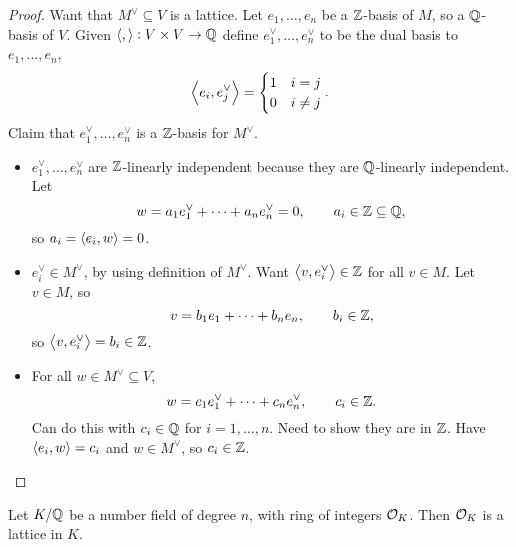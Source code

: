 \pagebreak

\begin{proof}
Want that $ M^\vee \subseteq V $ is a lattice. Let $ e_1, \dots, e_n $ be a $ \mathbb{Z} $-basis of $ M $, so a $ \mathbb{Q} $-basis of $ V $. Given $ \left\langle , \right\rangle : V \times V \to \mathbb{Q} $ define $ e_1^\vee, \dots, e_n^\vee $ to be the dual basis to $ e_1, \dots, e_n $,
$$ \left\langle e_i, e_j^\vee \right\rangle =
\begin{cases}
1 & i = j \\
0 & i \ne j
\end{cases}.
$$
Claim that $ e_1^\vee, \dots, e_n^\vee $ is a $ \mathbb{Z} $-basis for $ M^\vee $.
\begin{itemize}
\item $ e_1^\vee, \dots, e_n^\vee $ are $ \mathbb{Z} $-linearly independent because they are $ \mathbb{Q} $-linearly independent. Let
$$ w = a_1e_1^\vee + \dots + a_ne_n^\vee = 0, \qquad a_i \in \mathbb{Z} \subseteq \mathbb{Q}, $$
so $ a_i = \left\langle e_i, w \right\rangle = 0 $.
\item $ e_i^\vee \in M^\vee $, by using definition of $ M^\vee $. Want $ \left\langle v, e_i^\vee \right\rangle \in \mathbb{Z} $ for all $ v \in M $. Let $ v \in M $, so
$$ v = b_1e_1 + \dots + b_ne_n, \qquad b_i \in \mathbb{Z}, $$
so $ \left\langle v, e_i^\vee \right\rangle = b_i \in \mathbb{Z} $.
\item For all $ w \in M^\vee \subseteq V $,
$$ w = c_1e_1^\vee + \dots + c_ne_n^\vee, \qquad c_i \in \mathbb{Z}. $$
Can do this with $ c_i \in \mathbb{Q} $ for $ i = 1, \dots, n $. Need to show they are in $ \mathbb{Z} $. Have $ \left\langle e_i, w \right\rangle = c_i $ and $ w \in M^\vee $, so $ c_i \in \mathbb{Z} $.
\end{itemize}
\end{proof}

\begin{theorem}
Let $ K / \mathbb{Q} $ be a number field of degree $ n $, with ring of integers $ \mathcal{O}_K $. Then $ \mathcal{O}_K $ is a lattice in $ K $.
\end{theorem}

